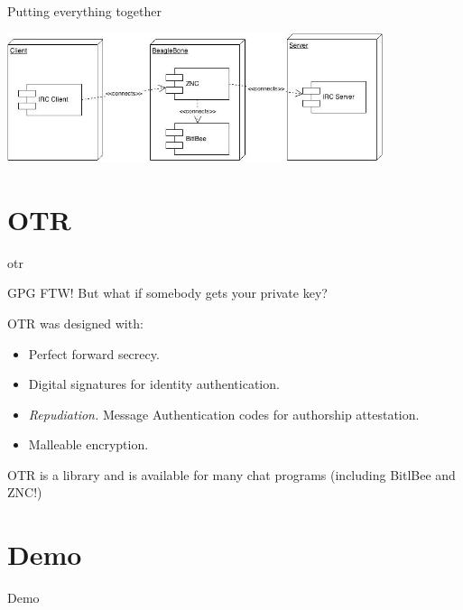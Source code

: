 \documentclass{beamer} \usetheme{Boadilla}
\begin{document}
\begin{frame}{Putting everything together}

    \begin{center}
      \includegraphics[width=11cm]{dd.jpg}
    \end{center}

\end{frame}

\section{OTR}

\begin{frame}{otr}

GPG FTW! But what if somebody gets your private key? \bigskip

OTR was designed with:

\begin{itemize}
\item Perfect forward secrecy. \bigskip
 \item Digital signatures for identity authentication. \bigskip
\item \emph{Repudiation.} Message Authentication codes for authorship
  attestation. \bigskip
\item Malleable encryption. \bigskip
\end{itemize}

OTR is a library and is available for many chat programs (including
BitlBee and ZNC!)
\end{frame}

\section{Demo}

\begin{frame}{Demo}


\end{frame}
\end{document}
